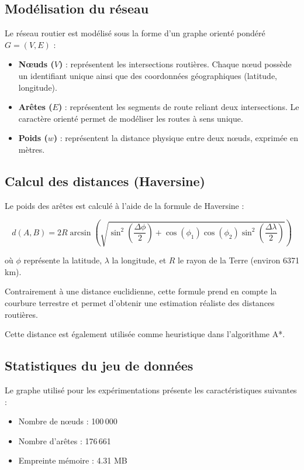 \documentclass[11pt]{article}
\begin{document}
\subsection{Modélisation du réseau}

Le réseau routier est modélisé sous la forme d’un graphe orienté pondéré $G = (V, E)$ :

\begin{itemize}
\item \textbf{Nœuds ($V$)} : représentent les intersections routières. Chaque nœud possède un identifiant unique ainsi que des coordonnées géographiques (latitude, longitude).
\item \textbf{Arêtes ($E$)} : représentent les segments de route reliant deux intersections. Le caractère orienté permet de modéliser les routes à sens unique.
\item \textbf{Poids ($w$)} : représentent la distance physique entre deux nœuds, exprimée en mètres.
\end{itemize}

\subsection{Calcul des distances (Haversine)}

Le poids des arêtes est calculé à l’aide de la formule de Haversine :

\[
d(A,B)=2R \arcsin\left(
\sqrt{
\sin^2\left(\frac{\Delta\phi}{2}\right)
+
\cos(\phi_1)\cos(\phi_2)\sin^2\left(\frac{\Delta\lambda}{2}\right)
}
\right)
\]

où $\phi$ représente la latitude, $\lambda$ la longitude, et $R$ le rayon de la Terre (environ 6371 km).

Contrairement à une distance euclidienne, cette formule prend en compte la courbure terrestre et permet d’obtenir une estimation réaliste des distances routières.

Cette distance est également utilisée comme heuristique dans l’algorithme A*.

\subsection{Statistiques du jeu de données}

Le graphe utilisé pour les expérimentations présente les caractéristiques suivantes :

\begin{itemize}
\item Nombre de nœuds : 100\,000
\item Nombre d’arêtes : 176\,661
\item Empreinte mémoire : 4.31 MB
\end{itemize}
\end{document}
